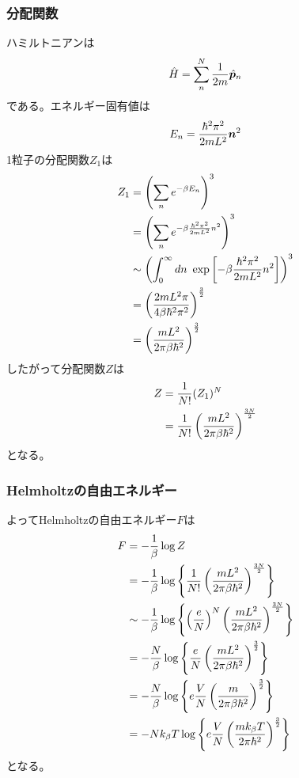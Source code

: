\documentclass{jsarticle}  %
\numberwithin{equation}{section} %
\numberwithin{figure}{section}
\begin{document}
\subsubsection{分配関数}
    ハミルトニアンは
    \begin{align}
        \hat{H} = \sum_n^N \frac{1}{2m} \hat{\bm{p}}_n \notag 
    \end{align}
    である。エネルギー固有値は
    \begin{align}
        E_n = \frac{\hbar^2 \pi^2}{2mL^2} \bm{n}^2 \notag 
    \end{align}
    1粒子の分配関数$Z_1$は
    \begin{align}
        Z_1 &= \left( \sum_n e^{-\beta E_n} \right)^3 \notag \\
        &= \left( \sum_n e^{-\beta \frac{\hbar^2 \pi^2}{2mL^2} n^2} \right)^3 \notag \\
        &\sim \left( \int_0^\infty dn\ \exp\left[ -\beta \frac{\hbar^2 \pi^2}{2mL^2} n^2 \right] \right)^3 \notag \\
        &= \left( \frac{2mL^2 \pi}{4\beta \hbar^2 \pi^2} \right)^{\frac{3}{2}} \notag \\
        &= \left( \frac{mL^2}{2\pi \beta \hbar^2 } \right)^{\frac{3}{2}} \notag 
    \end{align}
    したがって分配関数$Z$は
    \begin{align}
        Z &= \frac{1}{N!} (Z_1)^N \notag \\
        &= \frac{1}{N!} \left( \frac{mL^2}{2\pi \beta \hbar^2 } \right)^{\frac{3N}{2}}
    \end{align}
    となる。
\subsubsection{Helmholtzの自由エネルギー}
    よってHelmholtzの自由エネルギー$F$は
    \begin{align}
        F &= -\frac{1}{\beta} \log Z \notag \\
        &= -\frac{1}{\beta} \log \left\{ \frac{1}{N!} \left( \frac{mL^2}{2\pi \beta \hbar^2 } \right)^{\frac{3N}{2}} \right\} \notag \\
        &\sim -\frac{1}{\beta} \log \left\{ \left( \frac{e}{N} \right)^N \left( \frac{mL^2}{2\pi \beta \hbar^2 } \right)^{\frac{3N}{2}} \right\} \notag \\
        &= -\frac{N}{\beta} \log \left\{ \frac{e}{N} \left( \frac{mL^2}{2\pi \beta \hbar^2 } \right)^{\frac{3}{2}} \right\} \notag \\
        &= -\frac{N}{\beta} \log \left\{ e\frac{V}{N} \left( \frac{m}{2\pi \beta \hbar^2 } \right)^{\frac{3}{2}} \right\} \notag \\
        &= -Nk_\beta T \log \left\{ e\frac{V}{N} \left( \frac{mk_\beta T}{2\pi \hbar^2 } \right)^{\frac{3}{2}} \right\}
    \end{align}
    となる。
\end{document}
